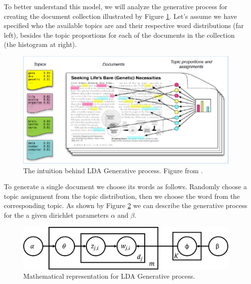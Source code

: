 	To better understand this model, we will analyze the generative process for creating the document collection illustrated by Figure \ref{fig:lda-generative-process}. Let's assume we have specified who the available topics are and their respective word distributions (far left), besides the topic proportions for each of the documents in the collection (the histogram at right).

	\begin{figure}[h!]
		\centering
		\includegraphics[width=\linewidth]{01.Chapters/02.Background/The-intuition-behind-LDA-Generative-process-by-D-Blei-17}
		\caption{The intuition behind LDA Generative process. Figure from  .}
		\label{fig:lda-generative-process}
	\end{figure}

	To generate a single document we choose its words as follows. Randomly choose a topic assignment from the topic distribution, then we choose the word from the corresponding topic. As shown by Figure \ref{fig:generative-probs} we can describe the generative process for the a given dirichlet parameters $\alpha$ and $\beta$.

	\begin{figure}[h!]
		\centering
		\includegraphics[width=0.7\linewidth]{01.Chapters/02.Background/generative-probs}
		\caption{Mathematical representation for LDA Generative process.}
		\label{fig:generative-probs}
	\end{figure}

